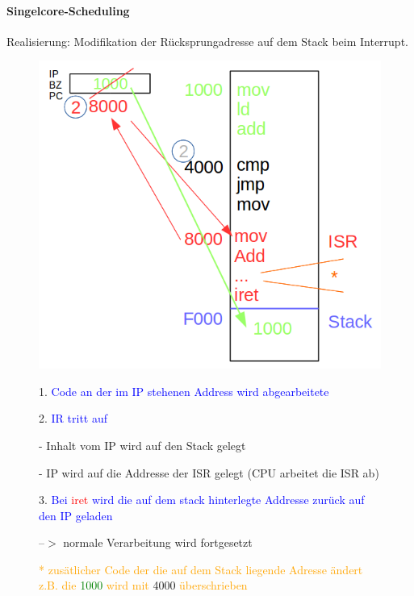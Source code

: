 \documentclass[12pt,a4paper,oneside,ngerman]{article}
\begin{document}
\paragraph{Singelcore-Scheduling}
Realisierung: Modifikation der Rücksprungadresse auf dem Stack beim Interrupt.

\begin{figure}[htbp]
	\begin{minipage}[t]{6cm}
	\vspace{0pt}
	\centering
	\includegraphics[scale=0.35]{umlet/Singelcore_scheduling.png}
	\end{minipage}
	\hfill
	\begin{minipage}[t]{6cm}
	\vspace{0pt}
	\begin{description}
	\item 1. \textcolor{blue}{Code an der im IP stehenen Address wird abgearbeitete}
	\item 2. \textcolor{blue}{IR tritt auf}
		\begin{description}
			\item - Inhalt vom IP wird auf den Stack gelegt
			\item - IP wird auf die Addresse der ISR gelegt (CPU arbeitet die ISR ab)
		\end{description}
	\item 3. \textcolor{blue}{Bei } \textcolor{red}{iret} \textcolor{blue}{ wird die auf dem stack hinterlegte Addresse zurück auf den IP geladen}
	\item --$>$ normale Verarbeitung wird fortgesetzt
	\end{description}
	\end{minipage}

	\textcolor{orange}{* zusätlicher Code der die auf dem Stack liegende Adresse ändert} \\
	\textcolor{orange}{z.B. die} \textcolor{green}{1000} \textcolor{orange} {wird mit} 4000 \textcolor{orange}{überschrieben} \\
\end{figure}
\end{document}
